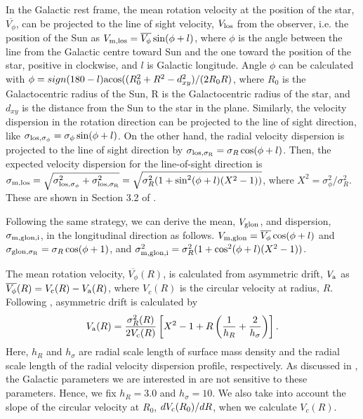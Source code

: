 \documentclass[11pt,a4paper]{article}
\begin{document}
In the Galactic rest frame, the mean rotation velocity at the position of the star, $\overline{V_{\phi}}$, can be projected to the line of sight velocity, $V_{\rm los}$ from the observer, i.e. the position of the Sun as $V_{\rm m,los}=\overline{V_{\phi}} \sin(\phi+l)$, where $\phi$ is the angle between the line from the Galactic centre toward Sun and the one toward the position of the star, positive in clockwise, and $l$ is Galactic longitude. Angle $\phi$ can be calculated with $\phi=sign(180-l) {\rm acos}((R_0^2+R^2-d_{xy}^2)/(2 R_0 R)$, where $R_0$ is the Galactocentric radius of the Sun, R is the Galactocentric radius of the star, and $d_{xy}$ is the distance from the Sun to the star in the plane. Similarly, the velocity dispersion in the rotation direction can be projected to the line of sight direction, like $\sigma_{\rm los, \sigma_{\phi}}=\sigma_{\phi} \sin(\phi+l)$. On the other hand, the radial velocity dispersion is projected to the line of sight direction by $\sigma_{\rm los, \sigma_{R}}=\sigma_R \cos(\phi+l)$. Then, the expected velocity dispersion for the line-of-sight direction is $\sigma_{\rm m,los}=\sqrt{\sigma_{\rm los, \sigma_{\phi}}^2+\sigma_{\rm los, \sigma_{R}}^2}=\sqrt{\sigma_R^2(1+\sin^2(\phi+l) (X^2-1))}$, where $X^2=\sigma_{\phi}^2/\sigma_{R}^2$. These are shown in Section 3.2 of \citet{baabbdc12}. 

Following the same strategy, we can derive the mean, $V_{\rm glon}$, and dispersion, $\sigma_{\rm m, glon,i}$, in the longitudinal direction as follows. $V_{\rm m, glon}=\overline{V_{\phi}}\cos(\phi+l)$ and $\sigma_{\rm glon,\sigma_R}=\sigma_R \cos(\phi+1)$, and $\sigma_{\rm m, glon,i}^2=\sigma_R^2(1+\cos^2(\phi+l) (X^2-1))$.

The mean rotation velocity, $\overline{V_{\phi}} (R)$, is calculated from asymmetric drift, $V_{\rm a}$ as $\overline{V_{\phi}}(R)=V_{\rm c} (R)-V_{\rm a}(R)$, where $V_c(R)$ is the circular velocity at radius, $R$. Following \citet{baabbdc12}, asymmetric drift is calculated by 
\begin{equation}
V_{\rm a}(R)=\frac{\sigma_R^2(R)}{2 V_{\rm c}(R)} \left[X^2-1+R\left(\frac{1}{h_R}+\frac{2}{h_{\sigma}}\right)\right].
\end{equation}
Here, $h_R$ and $h_{\sigma}$ are radial scale length of surface mass density and the radial scale length of the radial velocity dispersion profile, respectively. As discussed in \citet{baabbdc12}, the Galactic parameters we are interested in are not sensitive to these parameters. Hence, we fix $h_R=3.0$ and $h_{\sigma}=10$. We also take into account the slope of the circular velocity at $R_0$, $d V_{\rm c}(R_0)/dR$, when we calculate $V_c(R)$. 
\end{document}
